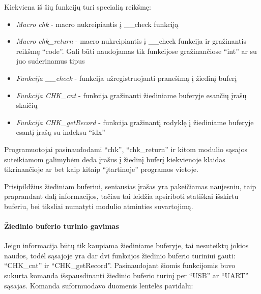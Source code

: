 \documentclass[12pt, a4paper, lithuanian, final]{article}
\begin{document}


\vspace{3cm}

Kiekviena iš šių funkcijų turi specialią reikšmę:
\begin{itemize}
	\item \textit{Macro chk} - macro nukreipiantis į \_\_check funkciją
	\item \textit{Macro chk\_return} - macro nukreipiantis į \_\_check funkcija ir gražinantis reikšmę "`code"'.
		Gali būti naudojamas tik funkcijose gražinančiose "`int"' ar su juo suderinamus tipus
	\item \textit{Funkcija \_\_check} - funkcija užregistruojanti pranešimą į žiedinį buferį
	\item \textit{Funkcija CHK\_cnt} - funkcija gražinanti žiediniame buferyje esančių įrašų skaičių
	\item \textit{Funkcija CHK\_getRecord} - funkcija gražinantį rodyklę į žiediniame buferyje esantį įrašą su indeksu "`idx"'
\end{itemize}


Programuotojai pasinaudodami "`chk"', "`chk\_return"' ir kitom modulio sąsajos suteikiamom galimybėm deda įrašus į žiedinį buferį kiekvienoje klaidas tikrinančioje ar bet kaip kitaip "`įtartinoje"' programos vietoje.

Prisipildžius žiediniam buferiui, seniausias įrašas yra pakeičiamas naujesniu, taip praprandant dalį informacijos, tačiau tai leidžia apsiriboti statiškai išskirtu buferiu, bei tiksliai numatyti modulio atminties suvartojimą.

\paragraph{Žiedinio buferio turinio gavimas}

Jeigu informacija būtų tik kaupiama žiediniame buferyje, tai nesuteiktų jokios naudos, todėl sąsajoje yra dar dvi funkcijos žiedinio buferio turiniui gauti: "`CHK\_cnt"' ir "`CHK\_getRecord"'.
Pasinaudojant šiomis funkcijomis buvo sukurta komanda išspausdinanti žiedinio buferio turinį per "`USB"' ar "`UART"' sąsajas.
Komanda suformuodavo duomenis lentelės pavidalu:
\begin{table}[h]
\caption{Žiedinio buferio turinio pavyzdys, kuomet nėra prijungtas sukonfigūruotas sensorius}
\end{table}
\end{document}
